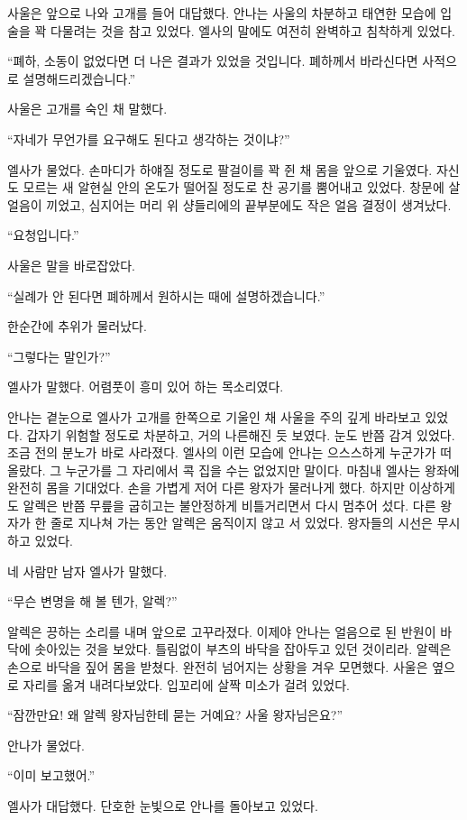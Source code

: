 사울은 앞으로 나와 고개를 들어 대답했다. 안나는 사울의 차분하고 태연한 모습에 입술을 꽉 다물려는 것을 참고 있었다. 엘사의 말에도 여전히 완벽하고 침착하게 있었다.

``폐하, 소동이 없었다면 더 나은 결과가 있었을 것입니다. 폐하께서 바라신다면 사적으로 설명해드리겠습니다.''

사울은 고개를 숙인 채 말했다.

``자네가 무언가를 요구해도 된다고 생각하는 것이냐?''

엘사가 물었다. 손마디가 하얘질 정도로 팔걸이를 꽉 쥔 채 몸을 앞으로 기울였다. 자신도 모르는 새 알현실 안의 온도가 떨어질 정도로 찬 공기를 뿜어내고 있었다. 창문에 살얼음이 끼었고, 심지어는 머리 위 샹들리에의 끝부분에도 작은 얼음 결정이 생겨났다.

``요청입니다.''

사울은 말을 바로잡았다.

``실례가 안 된다면 폐하께서 원하시는 때에 설명하겠습니다.''

한순간에 추위가 물러났다.

``그렇다는 말인가?''

엘사가 말했다. 어렴풋이 흥미 있어 하는 목소리였다.

안나는 곁눈으로 엘사가 고개를 한쪽으로 기울인 채 사울을 주의 깊게 바라보고 있었다. 갑자기 위험할 정도로 차분하고, 거의 나른해진 듯 보였다. 눈도 반쯤 감겨 있었다. 조금 전의 분노가 바로 사라졌다. 엘사의 이런 모습에 안나는 으스스하게 누군가가 떠올랐다. 그 누군가를 그 자리에서 콕 집을 수는 없었지만 말이다. 마침내 엘사는 왕좌에 완전히 몸을 기대었다. 손을 가볍게 저어 다른 왕자가 물러나게 했다. 하지만 이상하게도 알렉은 반쯤 무릎을 굽히고는 불안정하게 비틀거리면서 다시 멈추어 섰다. 다른 왕자가 한 줄로 지나쳐 가는 동안 알렉은 움직이지 않고 서 있었다. 왕자들의 시선은 무시하고 있었다.

네 사람만 남자 엘사가 말했다.

``무슨 변명을 해 볼 텐가, 알렉?''

알렉은 끙하는 소리를 내며 앞으로 고꾸라졌다. 이제야 안나는 얼음으로 된 반원이 바닥에 솟아있는 것을 보았다. 틀림없이 부츠의 바닥을 잡아두고 있던 것이리라. 알렉은 손으로 바닥을 짚어 몸을 받쳤다. 완전히 넘어지는 상황을 겨우 모면했다. 사울은 옆으로 자리를 옮겨 내려다보았다. 입꼬리에 살짝 미소가 걸려 있었다.

``잠깐만요! 왜 알렉 왕자님한테 묻는 거예요? 사울 왕자님은요?''

안나가 물었다.

``이미 보고했어.''

엘사가 대답했다. 단호한 눈빛으로 안나를 돌아보고 있었다.

